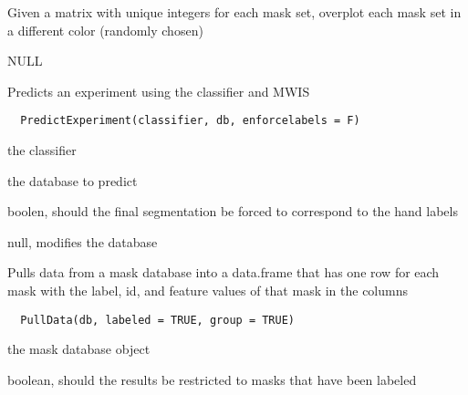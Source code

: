 \documentclass[a4paper]{book}
\begin{document}
%
\begin{Details}\relax
Given a matrix with unique integers for each mask set,
overplot each mask set in a different color (randomly
chosen)
\end{Details}
%
\begin{Value}
NULL
\end{Value}
%
\begin{Description}\relax
Predicts an experiment using the classifier and MWIS
\end{Description}
%
\begin{Usage}
\begin{verbatim}
  PredictExperiment(classifier, db, enforcelabels = F)
\end{verbatim}
\end{Usage}
%
\begin{Arguments}
\begin{ldescription}
\item[\code{classifier}] the classifier

\item[\code{dn}] the database to predict

\item[\code{enforcelabels}] boolen, should the final
segmentation be forced to correspond to the hand labels
\end{ldescription}
\end{Arguments}
%
\begin{Value}
null, modifies the database
\end{Value}
%
\begin{Description}\relax
Pulls data from a mask database into a data.frame that
has one row for each mask with the label, id, and feature
values of that mask in the columns
\end{Description}
%
\begin{Usage}
\begin{verbatim}
  PullData(db, labeled = TRUE, group = TRUE)
\end{verbatim}
\end{Usage}
%
\begin{Arguments}
\begin{ldescription}
\item[\code{db}] the mask database object

\item[\code{labeled}] boolean, should the results be restricted
to masks that have been labeled
\end{ldescription}
\end{Arguments}
\end{document}

